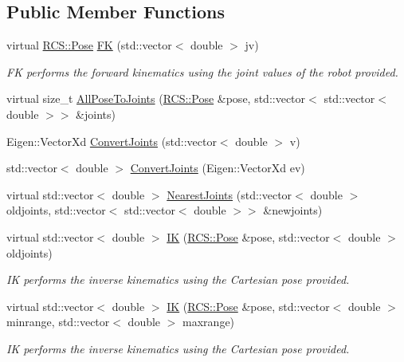 \subsection*{Public Member Functions}
\begin{DoxyCompactItemize}
\item 
virtual \hyperlink{namespaceRCS_aa07e45d8a50e30064283d2b38087f999}{R\-C\-S\-::\-Pose} \hyperlink{classFastKinematics_ad60c8729768b34e653c484a476d471a1}{F\-K} (std\-::vector$<$ double $>$ jv)
\begin{DoxyCompactList}\small\item\em F\-K performs the forward kinematics using the joint values of the robot provided. \end{DoxyCompactList}\item 
virtual size\-\_\-t \hyperlink{classFastKinematics_ab0a88c32e72ad25d48f38b851aabf3fa}{All\-Pose\-To\-Joints} (\hyperlink{namespaceRCS_aa07e45d8a50e30064283d2b38087f999}{R\-C\-S\-::\-Pose} \&pose, std\-::vector$<$ std\-::vector$<$ double $>$$>$ \&joints)
\item 
Eigen\-::\-Vector\-Xd \hyperlink{classFastKinematics_a14981dcd60b8fc6d64e6cf179c1a3ec1}{Convert\-Joints} (std\-::vector$<$ double $>$ v)
\item 
std\-::vector$<$ double $>$ \hyperlink{classFastKinematics_a98431d3915c8b4215992b0fa58af9df3}{Convert\-Joints} (Eigen\-::\-Vector\-Xd ev)
\item 
virtual std\-::vector$<$ double $>$ \hyperlink{classFastKinematics_a8814df8e8bf04cfe6fb48b6e6e8f5c1f}{Nearest\-Joints} (std\-::vector$<$ double $>$ oldjoints, std\-::vector$<$ std\-::vector$<$ double $>$$>$ \&newjoints)
\item 
virtual std\-::vector$<$ double $>$ \hyperlink{classFastKinematics_ad71d66aa03ef1c2d24a190346aa304a1}{I\-K} (\hyperlink{namespaceRCS_aa07e45d8a50e30064283d2b38087f999}{R\-C\-S\-::\-Pose} \&pose, std\-::vector$<$ double $>$ oldjoints)
\begin{DoxyCompactList}\small\item\em I\-K performs the inverse kinematics using the Cartesian pose provided. \end{DoxyCompactList}\item 
virtual std\-::vector$<$ double $>$ \hyperlink{classFastKinematics_a9f9b4b4f95039605a243a85adacd207f}{I\-K} (\hyperlink{namespaceRCS_aa07e45d8a50e30064283d2b38087f999}{R\-C\-S\-::\-Pose} \&pose, std\-::vector$<$ double $>$ minrange, std\-::vector$<$ double $>$ maxrange)
\begin{DoxyCompactList}\small\item\em I\-K performs the inverse kinematics using the Cartesian pose provided. \end{DoxyCompactList}\item 

\end{DoxyCompactItemize}
